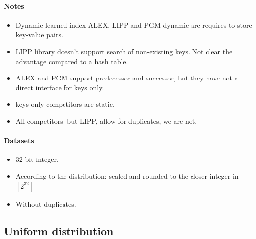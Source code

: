 \documentclass{article}
\begin{document}
\paragraph*{Notes}
\begin{itemize}
  \item Dynamic learned index ALEX, LIPP and PGM-dynamic are requires to store key-value pairs.
  \item LIPP library doesn't support search of non-existing keys. Not clear the advantage compared to a hash table.
  \item ALEX and PGM support predecessor and successor, but they have not a direct interface for keys only.
  \item keys-only competitors are static.
  \item All competitors, but LIPP, allow for duplicates, we are not.
\end{itemize}

\paragraph*{Datasets}
\begin{itemize}
\item 32 bit integer.
\item According to the distribution: scaled and rounded to the closer integer in $[2^{32}]$
\item Without duplicates.
\end{itemize}

\subsection{Uniform distribution}
\end{document}
